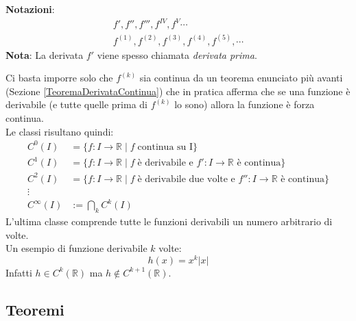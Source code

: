 \textbf{Notazioni}:
\begin{gather*}
	f', f'', f''', f^{IV}, f^{V} \cdots\\
	f^{(1)}, f^{(2)}, f^{(3)}, f^{(4)}, f^{(5)}, \cdots
\end{gather*}
\textbf{Nota}: La derivata $f'$ viene spesso chiamata \textit{derivata prima}.

Ci basta imporre solo che $f^{(k)}$ sia continua da un teorema enunciato più avanti (Sezione \ref{TeoremaDerivataContinua}) che in pratica afferma che se una funzione è derivabile (e tutte quelle prima di $f^{(k)}$ lo sono) allora la funzione è forza continua.\\

Le classi risultano quindi:
\begin{align*}
	C^0 (I) &= \{f: I \to \mathbb{R}\; |\; f \; \text{continua su I}\}\\
	C^1 (I) &= \{f: I \to \mathbb{R}\; |\; f \; \text{è derivabile e } f':I \to \mathbb{R} \text{ è continua}\}\\
	C^2 (I) &= \{f: I \to \mathbb{R}\; |\; f \; \text{è derivabile due volte e } f'':I \to \mathbb{R} \text{ è continua}\}\\
	\vdots\\
	C^\infty (I) &:= \bigcap_{k} C^k (I)
\end{align*}
L'ultima classe comprende tutte le funzioni derivabili un numero arbitrario di volte.\\

Un esempio di funzione derivabile $k$ volte:
\begin{equation*}
	h(x) = x^k |x|  
\end{equation*}
Infatti $h \in C^k (\mathbb{R})$ ma $h \not \in C^{k+1} (\mathbb{R})$.


\subsection{Teoremi}

